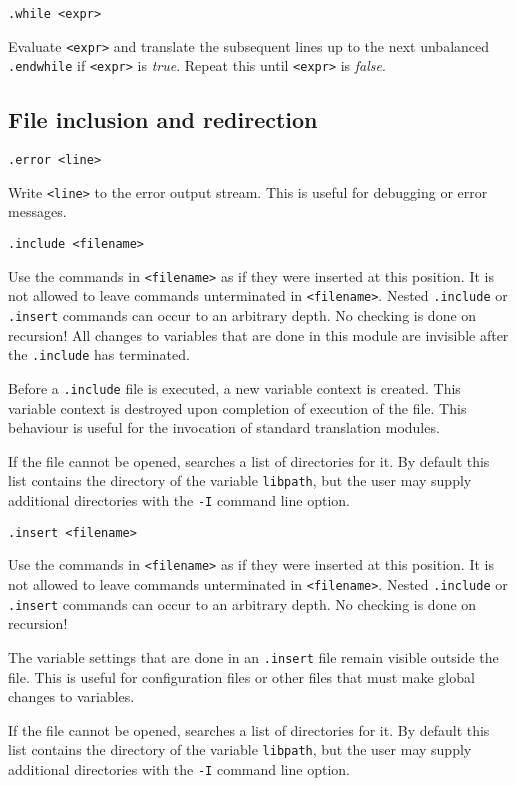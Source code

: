 \begin{verbatim}
.while <expr>
\end{verbatim}
\begin{desc}
Evaluate {\tt <expr>} and translate the subsequent lines up to the next
unbalanced {\tt .endwhile} if {\tt <expr>} is {\it true}.
Repeat this until {\tt <expr>} is {\it false}.
\end{desc}
\subsection{File inclusion and redirection}
\begin{verbatim}
.error <line>
\end{verbatim}
\begin{desc}
Write {\tt <line>} to the error output stream.
This is useful for debugging or error messages.
\end{desc}
\begin{verbatim}
.include <filename>
\end{verbatim}
\begin{desc}
Use the {\Tm} commands in {\tt <filename>} as if they were inserted at
this position.
It is not allowed to leave commands unterminated in {\tt <filename>}.
Nested {\tt .include} or {\tt .insert} commands can occur to an arbitrary depth.
No checking is done on recursion!
All changes to variables that are done in this module are invisible after
the {\tt .include} has terminated.
\par
Before a \verb'.include' file is executed, a new variable context is
created. This variable context is destroyed upon completion of execution
of the file. This behaviour is useful for the invocation of standard
translation modules.
\par
If the file cannot be opened, {\Tm} searches a list of directories for it.
By default this list contains the directory of the variable
\verb+libpath+, but the user may supply additional directories with the
\verb+-I+ command line option.
\end{desc}
\begin{verbatim}
.insert <filename>
\end{verbatim}
\begin{desc}
Use the {\Tm} commands in {\tt <filename>} as if they were inserted at
this position.
It is not allowed to leave commands unterminated in {\tt <filename>}.
Nested {\tt .include} or {\tt .insert}
commands can occur to an arbitrary depth.
No checking is done on recursion!
\par
The variable settings that are done in an {\tt .insert}
file remain visible outside the file.
This is useful for configuration files or other files that
must make global changes to variables.
\par
If the file cannot be opened, {\Tm} searches a list of directories for it.
By default this list contains the directory of the variable
\verb+libpath+, but the user may supply additional directories with the
\verb+-I+ command line option.
\end{desc}
